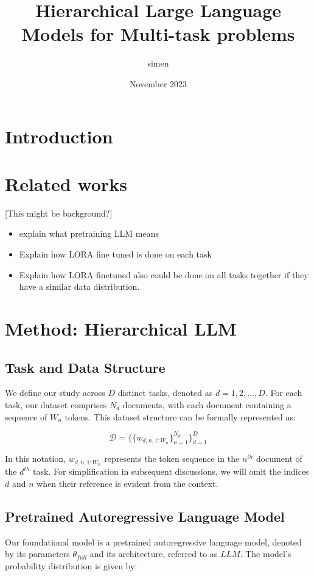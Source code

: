\documentclass{article}
\title{Hierarchical Large Language Models for Multi-task problems}
\author{simen }
\date{November 2023}
\begin{document}
\maketitle

\section{Introduction}

\section{Related works}
[This might be background?]
\begin{itemize}
    \item explain what pretraining LLM means
    \item Explain how LORA fine tuned is done on each task
    \item Explain how LORA finetuned also could be done on all tasks together if they have a similar data distribution.
\end{itemize}


\section{Method: Hierarchical LLM}

\subsection{Task and Data Structure}
We define our study across $D$ distinct tasks, denoted as $d=1,2,...,D$. For each task, our dataset comprises $N_d$ documents, with each document containing a sequence of $W_n$ tokens. This dataset structure can be formally represented as:

\begin{equation} \label{eq:data}
\mathcal{D} = \{ \{ w_{d,n,1:W_n} \}_{n=1}^{N_d} \}_{d=1}^D
\end{equation}

In this notation, $w_{d,n,1:W_n}$ represents the token sequence in the $n^{th}$ document of the $d^{th}$ task. For simplification in subsequent discussions, we will omit the indices $d$ and $n$ when their reference is evident from the context.

\subsection{Pretrained Autoregressive Language Model}
Our foundational model is a pretrained autoregressive language model, denoted by its parameters $\theta_{full}$ and its architecture, referred to as $LLM$. The model's probability distribution is given by:
\end{document}
